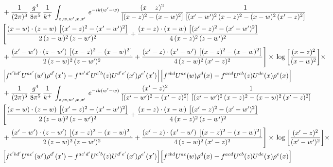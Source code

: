 \documentclass[9pt]{article}
\numberwithin{equation}{section}
\begin{document}
\begin{align}
&   +\frac{1}{(2\pi)^{3}}\, \frac{g^{4}}{8\pi^{5}}\,\frac{1}{k^{+}}\,\int_{z,w,w^{\prime},x,x'}\, e^{-ik(w^{\prime}-w)}\,\frac{(x-z)^{2}}{\left[(x-z)^{2}-(x-w)^{2}\right]}\,\frac{1}{\left[(x'-w')^{2}\,(x-z)^{2} - (x-w)^{2}\,(x'-z)^{2}\right]}\notag \\ & \Bigg[\frac{(x-w)\cdot (z-w)\, \left[(x'-z)^{2}-(x'-w')^{2}\right]}{2\, (z-w)^{2}\, (z-w')^{2}}  + \frac{(x-z)\cdot (x-w)\,\left[(x'-z)^{2}-(x'-w')^{2}\right] }{4\,(x-z)^{2}\,(z-w')^{2}}\notag \\ & +\frac{(x'-w')\cdot (z-w')\, \left[(x-z)^{2}-(x-w)^{2}\right]}{2\, (z-w)^{2}\, (z-w')^{2}}+ \frac{(x'-z)\cdot (x'-w')\, \left[(x-z)^{2}-(x-w)^{2}\right]}{4\, (z-w)^{2}\,(x'-z)^{2}}\Bigg]\times\, \log{\left[\frac{(x-z)^{2}}{(x-w)^{2}}\right]} \times\notag \\ & \Big[f^{c'bd'}U^{ac'}(w')\rho^{d'}(x')-f^{ac'd'}U^{c'b}(z)U^{d'e'}(x')\rho^{e'}(x')\Big]\Big[f^{cbd}U^{ac}(w)\rho^{d}(x)-f^{acd}U^{cb}(z)U^{de}(x)\rho^{e}(x)\Big] \notag \\
& +\frac{1}{(2\pi)^{3}}\, \frac{g^{4}}{8\pi^{5}}\,\frac{1}{k^{+}}\,\int_{z,w,w^{\prime},x,x'}\, e^{-ik(w^{\prime}-w)}\,\frac{(x'-z)^{2}}{\left[(x'-w')^{2}-(x'-z)^{2}\right]}\,\frac{1}{\left[(x'-w')^{2}\,(x-z)^{2} - (x-w)^{2}\,(x'-z)^{2}\right]}\notag \\ & \Bigg[\frac{(x-w)\cdot (z-w)\, \left[(x'-z)^{2}-(x'-w')^{2}\right]}{2\, (z-w)^{2}\, (z-w')^{2}}  + \frac{(x-z)\cdot (x-w)\,\left[(x'-z)^{2}-(x'-w')^{2}\right] }{4\,(x-z)^{2}\,(z-w')^{2}}\notag \\ & +\frac{(x'-w')\cdot (z-w')\, \left[(x-z)^{2}-(x-w)^{2}\right]}{2\, (z-w)^{2}\, (z-w')^{2}}+ \frac{(x'-z)\cdot (x'-w')\, \left[(x-z)^{2}-(x-w)^{2}\right]}{4\, (z-w)^{2}\,(x'-z)^{2}}\Bigg]\times\, \log{\left[\frac{(x'-z)^{2}}{(x'-w')^{2}}\right]} \times\notag \\ & \Big[f^{c'bd'}U^{ac'}(w')\rho^{d'}(x')-f^{ac'd'}U^{c'b}(z)U^{d'e'}(x')\rho^{e'}(x')\Big]\Big[f^{cbd}U^{ac}(w)\rho^{d}(x)-f^{acd}U^{cb}(z)U^{de}(x)\rho^{e}(x)\Big]
\end{align}
\end{document}
